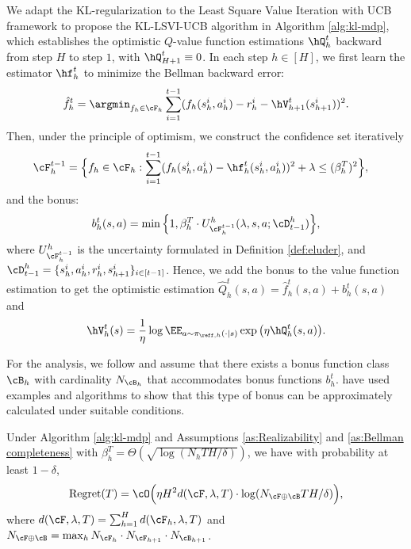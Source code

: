 \documentclass[11pt]{article}
\begin{document}
We adapt the KL-regularization to the Least Square Value Iteration with UCB framework \citep{zhang2022feel,wang2020reinforcement} to propose the KL-LSVI-UCB algorithm in Algorithm \ref{alg:kl-mdp}, which establishes the optimistic $Q$-value function estimations $\hQ_h^t$ backward from step $H$ to step $1$, with $\hQ_{H+1}^t\equiv0$. In each step $h\in[H]$, we first learn the estimator $\hf_h^t$ to minimize the Bellman backward error:
\begin{align*}
    \hat f_h^t = \argmin_{f_h \in \cF_h} \sum_{i = 1}^{t - 1} (f_h(s_h^i, a_h^i) - r_h^i - \hV^t_{h + 1}(s_{h + 1}^i))^2.
\end{align*}
Then, under the principle of optimism, we construct the confidence set iteratively
\begin{equation*}
\begin{aligned}
    &\cF_h^{t-1} = \Big\{f_h\in\cF_h: \sum_{i=1}^{t-1}(f_h(s_h^i,a_h^i) - \hf_h^t(s_h^i,a_h^i))^2 +\lambda\le (\beta_h^T)^2\Big\},
\end{aligned}
\end{equation*}
and the bonus:
\begin{equation}
\label{eq:bonus_mdp}
\begin{aligned}
    b_h^t(s,a) = \min\Big\{1, \beta_h^T\cdot U^h_{\cF_h^{t-1}}(\lambda,s, a; \cD^h_{t-1})\Big\},
\end{aligned}
\end{equation}
where $U^h_{\cF_h^{t-1}}$ is the uncertainty formulated in Definition \ref{def:eluder}, and $\cD^h_{t-1}=\{s_h^i,a_h^i,r_h^i,s_{h+1}^i\}_{i\in[t-1]}$. Hence, we add the bonus to the value function estimation to get the optimistic estimation $\hat Q^t_h(s, a) =\hat f^t_h(s, a) + b^t_h(s, a)$ and 
\begin{equation*}
\begin{aligned}
    \hV^t_h(s) = \frac1\eta \log \EE_{a \sim \pi_{\reff,h}(\cdot |s)}\exp\big(\eta \hQ^t_{h}(s,a)\big).
\end{aligned}
\end{equation*}

For the analysis, we follow \citet{ye2023corruption,wang2020reinforcement} and assume that there exists a bonus function class $\cB_h$ with cardinality $N_{\cB_{h}}$ that accommodates bonus functions $b_h^t$. \citet{ye2023corruption,wang2020reinforcement} have used examples and algorithms to show that this type of bonus can be approximately calculated under suitable conditions.

\begin{theorem}\label{th:mdp}
Under Algorithm \ref{alg:kl-mdp} and Assumptions \ref{as:Realizability} and \ref{as:Bellman completeness} with $\beta_h^T = \Theta(\sqrt{\log(N_h T H / \delta)})$, we have with probability at least $1-\delta$,
$$
\mathrm{Regret}(T)
= \cO\Big(\eta H^2 d(\cF,\lambda,T) \cdot \log(N_{\cF\oplus\cB} TH /\delta)\Big),
$$
where $d(\cF,\lambda,T)=\sum_{h=1}^Hd(\cF_h,\lambda,T)$ and $N_{\cF\oplus\cB}=\max_h N_{\cF_h}\cdot N_{\cF_{h+1}}\cdot N_{\cB_{h+1}}$.
\end{theorem}
\end{document}
